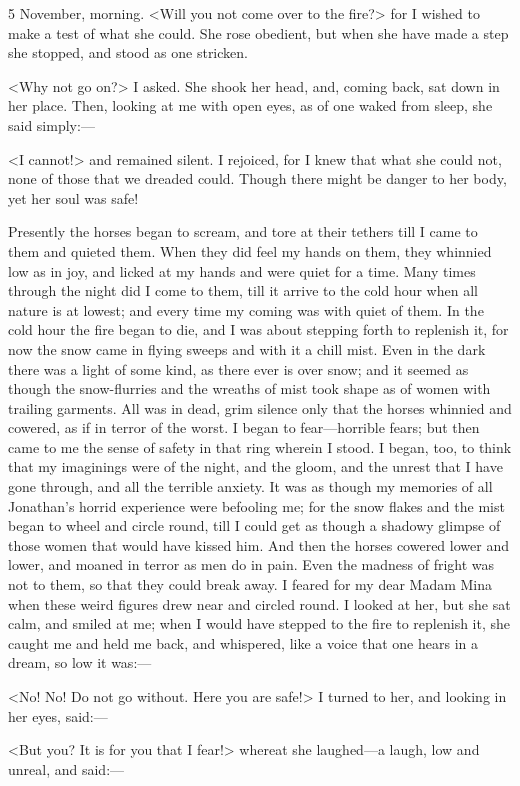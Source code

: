 \begin{diary}{5 November, morning.}
<Will you not come over to the fire?> for I wished to make a test of what she could. She rose obedient, but when she have made a step she stopped, and stood as one stricken.

<Why not go on?> I asked. She shook her head, and, coming back, sat down in her place. Then, looking at me with open eyes, as of one waked from sleep, she said simply:—

<I cannot!> and remained silent. I rejoiced, for I knew that what she could not, none of those that we dreaded could. Though there might be danger to her body, yet her soul was safe!

Presently the horses began to scream, and tore at their tethers till I came to them and quieted them. When they did feel my hands on them, they whinnied low as in joy, and licked at my hands and were quiet for a time. Many times through the night did I come to them, till it arrive to the cold hour when all nature is at lowest; and every time my coming was with quiet of them. In the cold hour the fire began to die, and I was about stepping forth to replenish it, for now the snow came in flying sweeps and with it a chill mist. Even in the dark there was a light of some kind, as there ever is over snow; and it seemed as though the snow-flurries and the wreaths of mist took shape as of women with trailing garments. All was in dead, grim silence only that the horses whinnied and cowered, as if in terror of the worst. I began to fear—horrible fears; but then came to me the sense of safety in that ring wherein I stood. I began, too, to think that my imaginings were of the night, and the gloom, and the unrest that I have gone through, and all the terrible anxiety. It was as though my memories of all Jonathan's horrid experience were befooling me; for the snow flakes and the mist began to wheel and circle round, till I could get as though a shadowy glimpse of those women that would have kissed him. And then the horses cowered lower and lower, and moaned in terror as men do in pain. Even the madness of fright was not to them, so that they could break away. I feared for my dear Madam Mina when these weird figures drew near and circled round. I looked at her, but she sat calm, and smiled at me; when I would have stepped to the fire to replenish it, she caught me and held me back, and whispered, like a voice that one hears in a dream, so low it was:—

<No! No! Do not go without. Here you are safe!> I turned to her, and looking in her eyes, said:—

<But you? It is for you that I fear!> whereat she laughed—a laugh, low and unreal, and said:—


\end{diary}

